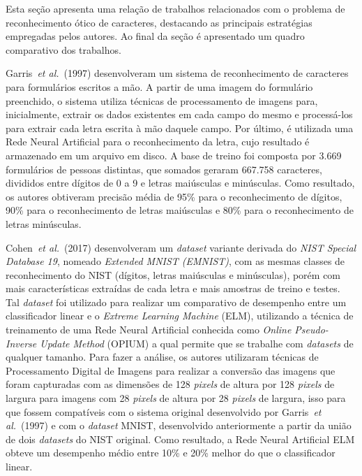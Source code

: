 \documentclass[12pt,oneside,a4paper,chapter=TITLE,section=TITLE,sumario
		=tradicional]{abntex2}
\begin{document}
		Esta seção apresenta uma relação de trabalhos relacionados com o problema de reconhecimento ótico de caracteres, destacando as principais estratégias empregadas pelos autores. Ao final da seção é apresentado um quadro comparativo dos trabalhos.
		
		Garris~\textit{et al.}~(1997) desenvolveram um sistema de reconhecimento de caracteres para formulários escritos a mão. A partir de uma imagem do formulário preenchido, o sistema utiliza técnicas de processamento de imagens para, inicialmente, extrair os dados existentes em cada campo do mesmo e processá-los para extrair cada letra escrita à mão daquele campo. Por último, é utilizada uma Rede Neural Artificial para o reconhecimento da letra, cujo resultado é armazenado em um arquivo em disco. A base de treino foi composta por 3.669 formulários de pessoas distintas, que somados geraram 667.758 caracteres, divididos entre dígitos de 0 a 9 e letras maiúsculas e minúsculas. Como resultado, os autores obtiveram precisão média de 95\% para o reconhecimento de dígitos, 90\% para o reconhecimento de letras maiúsculas e 80\% para o reconhecimento de letras minúsculas.  
		
		Cohen~\textit{et al.}~(2017) desenvolveram um \textit{dataset} variante derivada do \textit{NIST Special Database 19}, nomeado \textit{Extended MNIST (EMNIST)}, com as mesmas classes de reconhecimento do NIST (dígitos, letras maiúsculas e minúsculas), porém com mais características extraídas de cada letra e mais amostras de treino e testes. Tal \textit{dataset} foi utilizado para realizar um comparativo de desempenho entre um classificador linear e o \textit{Extreme Learning Machine} (ELM), utilizando a técnica de treinamento de uma Rede Neural Artificial conhecida como \textit{Online Pseudo-Inverse Update Method} (OPIUM) a qual permite que se trabalhe com \textit{datasets} de qualquer tamanho. Para fazer a análise, os autores utilizaram técnicas de Processamento Digital de Imagens para realizar a conversão das imagens que foram capturadas com as dimensões de 128 \textit{pixels} de altura por 128 \textit{pixels} de largura para imagens com 28 \textit{pixels} de altura por 28 \textit{pixels} de largura, isso para que fossem compatíveis com o sistema original desenvolvido por Garris~\textit{et al.}~(1997) e com o \textit{dataset} MNIST, desenvolvido anteriormente a partir da união de dois \textit{datasets} do NIST original. Como resultado, a Rede Neural Artificial ELM obteve um desempenho médio entre 10\% e 20\% melhor do que o classificador linear.		
		
\end{document}
